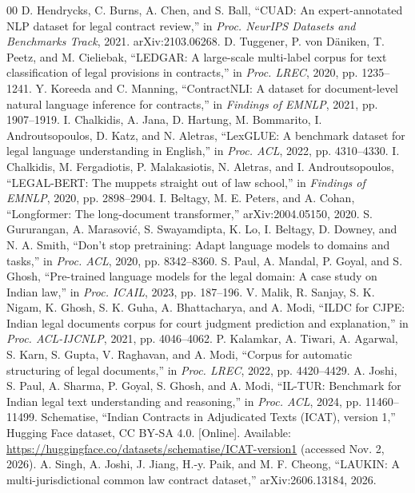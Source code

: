 \documentclass[conference]{IEEEtran}
\begin{document}
\begin{thebibliography}{00}
 D. Hendrycks, C. Burns, A. Chen, and S. Ball, ``CUAD: An expert-annotated NLP dataset for legal contract review,'' in \emph{Proc. NeurIPS Datasets and Benchmarks Track}, 2021. arXiv:2103.06268.
 D. Tuggener, P. von D\"aniken, T. Peetz, and M. Cieliebak, ``LEDGAR: A large-scale multi-label corpus for text classification of legal provisions in contracts,'' in \emph{Proc. LREC}, 2020, pp. 1235--1241.
 Y. Koreeda and C. Manning, ``ContractNLI: A dataset for document-level natural language inference for contracts,'' in \emph{Findings of EMNLP}, 2021, pp. 1907--1919.
 I. Chalkidis, A. Jana, D. Hartung, M. Bommarito, I. Androutsopoulos, D. Katz, and N. Aletras, ``LexGLUE: A benchmark dataset for legal language understanding in English,'' in \emph{Proc. ACL}, 2022, pp. 4310--4330.
 I. Chalkidis, M. Fergadiotis, P. Malakasiotis, N. Aletras, and I. Androutsopoulos, ``LEGAL-BERT: The muppets straight out of law school,'' in \emph{Findings of EMNLP}, 2020, pp. 2898--2904.
 I. Beltagy, M. E. Peters, and A. Cohan, ``Longformer: The long-document transformer,'' arXiv:2004.05150, 2020.
 S. Gururangan, A. Marasovi\'c, S. Swayamdipta, K. Lo, I. Beltagy, D. Downey, and N. A. Smith, ``Don't stop pretraining: Adapt language models to domains and tasks,'' in \emph{Proc. ACL}, 2020, pp. 8342--8360.
 S. Paul, A. Mandal, P. Goyal, and S. Ghosh, ``Pre-trained language models for the legal domain: A case study on Indian law,'' in \emph{Proc. ICAIL}, 2023, pp. 187--196.
 V. Malik, R. Sanjay, S. K. Nigam, K. Ghosh, S. K. Guha, A. Bhattacharya, and A. Modi, ``ILDC for CJPE: Indian legal documents corpus for court judgment prediction and explanation,'' in \emph{Proc. ACL-IJCNLP}, 2021, pp. 4046--4062.
 P. Kalamkar, A. Tiwari, A. Agarwal, S. Karn, S. Gupta, V. Raghavan, and A. Modi, ``Corpus for automatic structuring of legal documents,'' in \emph{Proc. LREC}, 2022, pp. 4420--4429.
 A. Joshi, S. Paul, A. Sharma, P. Goyal, S. Ghosh, and A. Modi, ``IL-TUR: Benchmark for Indian legal text understanding and reasoning,'' in \emph{Proc. ACL}, 2024, pp. 11460--11499.
 Schematise, ``Indian Contracts in Adjudicated Texts (ICAT), version 1,'' Hugging Face dataset, CC BY-SA 4.0. [Online]. Available: \url{https://huggingface.co/datasets/schematise/ICAT-version1} (accessed Nov. 2, 2026).
 A. Singh, A. Joshi, J. Jiang, H.-y. Paik, and M. F. Cheong, ``LAUKIN: A multi-jurisdictional common law contract dataset,'' arXiv:2606.13184, 2026.
\end{thebibliography}
\end{document}
